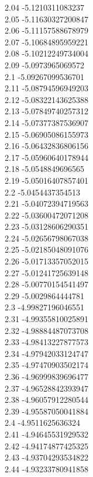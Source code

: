 {2.04	-5.1210311083237\\
2.05	-5.11630327200847\\
2.06	-5.11157588678979\\
2.07	-5.10684895959221\\
2.08	-5.10212249734004\\
2.09	-5.0973965069572\\
2.1	-5.09267099536701\\
2.11	-5.08794596949203\\
2.12	-5.08322143625388\\
2.13	-5.07849740257312\\
2.14	-5.07377387536907\\
2.15	-5.06905086155973\\
2.16	-5.06432836806156\\
2.17	-5.05960640178944\\
2.18	-5.0548849696565\\
2.19	-5.05016407857401\\
2.2	-5.0454437354513\\
2.21	-5.04072394719563\\
2.22	-5.03600472071208\\
2.23	-5.03128606290351\\
2.24	-5.02656798067038\\
2.25	-5.02185048091076\\
2.26	-5.01713357052015\\
2.27	-5.01241725639148\\
2.28	-5.00770154541497\\
2.29	-5.0029864444781\\
2.3	-4.99827196046551\\
2.31	-4.99355810025891\\
2.32	-4.98884487073708\\
2.33	-4.98413227877573\\
2.34	-4.97942033124747\\
2.35	-4.97470903502174\\
2.36	-4.96999839696477\\
2.37	-4.96528842393947\\
2.38	-4.96057912280544\\
2.39	-4.95587050041884\\
2.4	-4.9511625636324\\
2.41	-4.94645531929532\\
2.42	-4.94174877425325\\
2.43	-4.93704293534822\\
2.44	-4.93233780941858\\
}
